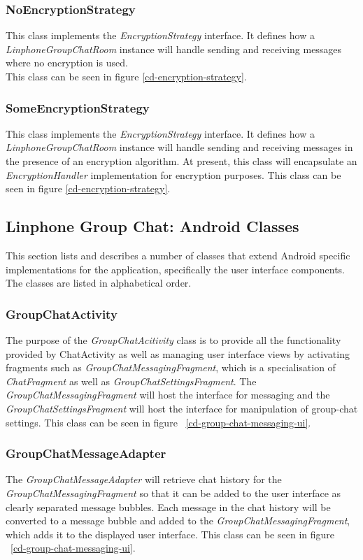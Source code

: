 \documentclass[11pt]{article}
\begin{document}
\subsubsection{NoEncryptionStrategy}
This class implements the \textit{EncryptionStrategy} interface. It defines how a \textit{LinphoneGroupChatRoom} instance will handle sending and receiving messages where no encryption is used. \\
This class can be seen in figure \ref{cd-encryption-strategy}.
\subsubsection{SomeEncryptionStrategy}
This class implements the \textit{EncryptionStrategy} interface. It defines how a \textit{LinphoneGroupChatRoom} instance will handle sending and receiving messages in the presence of an encryption algorithm. At present, this class will encapsulate an \textit{EncryptionHandler} implementation for encryption purposes.
This class can be seen in figure \ref{cd-encryption-strategy}.

\subsection{Linphone Group Chat: Android Classes}
This section lists and describes a number of classes that extend Android specific implementations for the application, specifically the user interface components. The classes are listed in alphabetical order.
\subsubsection{GroupChatActivity}\label{subsubsec: groupchatactivity}
The purpose of the \textit{GroupChatAcitivity} class is to provide all the functionality provided by ChatActivity as well as managing user interface views by activating fragments such as \textit{GroupChatMessagingFragment}, which is a specialisation of \textit{ChatFragment} as well as \textit{GroupChatSettingsFragment}. The \textit{GroupChatMessagingFragment} will host the interface for messaging and the \textit{GroupChatSettingsFragment} will host the interface for manipulation of group-chat settings. This class can be seen in figure ~\ref{cd-group-chat-messaging-ui}.
\subsubsection{GroupChatMessageAdapter}
The \textit{GroupChatMessageAdapter} will retrieve chat history for the \textit{GroupChatMessagingFragment} so that it can be added to the user interface as clearly separated message bubbles. Each message in the chat history will be converted to a message bubble and added to the \textit{GroupChatMessagingFragment}, which adds it to the displayed user interface. This class can be seen in figure ~\ref{cd-group-chat-messaging-ui}.
\end{document}
